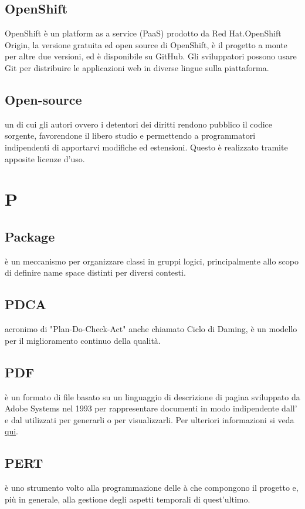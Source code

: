 \documentclass[12pt,a4paper]{article}
\begin{document}
\subsection{OpenShift}
OpenShift è un platform as a service (PaaS) prodotto da Red Hat.OpenShift Origin, la versione gratuita ed open source di OpenShift, è il progetto a monte per altre due versioni, ed è disponibile su GitHub. Gli sviluppatori possono usare Git per distribuire le applicazioni web in diverse lingue sulla piattaforma.

\subsection{Open-source} 
 un  di cui gli autori ovvero i detentori dei diritti rendono pubblico il codice sorgente, favorendone il libero studio e permettendo a programmatori indipendenti di apportarvi modifiche ed estensioni. Questo è realizzato tramite apposite licenze d'uso.

\newpage

\section{P}

\subsection{Package} 
è un meccanismo per organizzare classi  in gruppi logici, principalmente allo scopo di definire name space distinti per diversi contesti.

\subsection{PDCA} 
 acronimo di "Plan-Do-Check-Act" anche chiamato Ciclo di Daming, è un modello per il miglioramento continuo della qualità.

\subsection{PDF} 
 è un formato di file basato su un linguaggio di descrizione di pagina sviluppato da Adobe Systems nel 1993 per rappresentare documenti in modo indipendente dall’ e dal  utilizzati per generarli o per visualizzarli. Per ulteriori informazioni si veda \href{http://it.wikipedia.org/wiki/Portable_Document_Format}{qui}.

\subsection{PERT} 
 è uno strumento volto alla programmazione delle à che compongono il progetto e, più in generale, alla gestione degli aspetti temporali di quest'ultimo.
\end{document}
